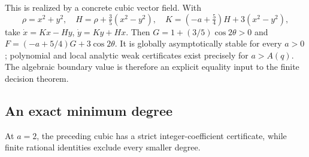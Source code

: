 \documentclass[11pt,a4paper]{article}
\theoremstyle{remark}\newtheorem{remark}[theorem]{Remark}
\begin{document}
This is realized by a concrete cubic vector field. With
\[
 \rho=x^2+y^2,\quad
 H=\rho+\tfrac35(x^2-y^2),\quad
 K=(-a+\tfrac54)H+3(x^2-y^2),
\]
take \(\dot x=Kx-Hy\), \(\dot y=Ky+Hx\).
Then \(G=1+(3/5)\cos2\theta>0\) and
\(F=(-a+5/4)G+3\cos2\theta\).
It is globally asymptotically stable for every \(a>0\);
polynomial and local analytic weak certificates exist precisely
for \(a>A(q)\). The algebraic boundary value is therefore an
explicit equality input to the finite decision theorem.

\subsection{An exact minimum degree}
At \(a=2\), the preceding cubic has a strict integer-coefficient
certificate, while finite rational identities exclude every smaller degree.
\end{document}
